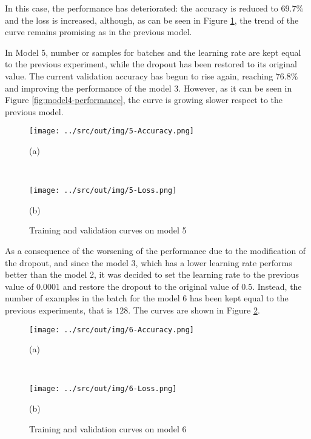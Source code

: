 \documentclass[a4paper,12pt]{article} %
\begin{document}
	In this case, the performance has deteriorated: the accuracy is reduced to 
	$69.7\%$ and the loss is increased, although, as can be seen in Figure 
	\ref*{fig:model5-performance}, the trend of the curve remains promising as 
	in the previous model.
	\newline
	
	In Model 5, number or samples for batches and the learning rate are kept 
	equal to the previous experiment, while the dropout has been restored to 
	its original value. 
	The current validation accuracy has begun to rise again, reaching $76.8\%$ 
	and improving the performance of the model 3. However, as it can be seen in 
	Figure \ref{fig:model4-performance}, the curve is growing slower respect to 
	the previous model.
	
	\begin{figure}[htb]
		\begin{minipage}[c]{.49\textwidth}
			\centering
			\texttt{[image: ../src/out/img/5-Accuracy.png]}
			\caption*{(a)}
		\end{minipage}
		~
		\begin{minipage}[c]{.49\textwidth}
			\centering
			\texttt{[image: ../src/out/img/5-Loss.png]}
			\caption*{(b)}
		\end{minipage}
		\caption{Training and validation curves on model 5}
		\label{fig:model5-performance}
	\end{figure}

	As a consequence of the worsening of the performance due to the 
	modification of the dropout, and since the model 3, which has a lower 
	learning rate performs better than the model 2, it was decided to set 
	the learning rate to the previous value of $0.0001$ and restore the dropout 
	to the original value of $0.5$. Instead, the number of examples in the 
	batch for the model 6 has been kept equal to the previous experiments, that 
	is $128$. 
	The curves are shown in Figure \ref{fig:model6-performance}.
		
	\begin{figure}[H]
		\begin{minipage}[c]{.49\textwidth}
			\centering
			\texttt{[image: ../src/out/img/6-Accuracy.png]}
			\caption*{(a)}
		\end{minipage}
		~
		\begin{minipage}[c]{.49\textwidth}
			\centering
			\texttt{[image: ../src/out/img/6-Loss.png]}
			\caption*{(b)}
		\end{minipage}
		\caption{Training and validation curves on model 6}
		\label{fig:model6-performance}
	\end{figure}
\end{document}
